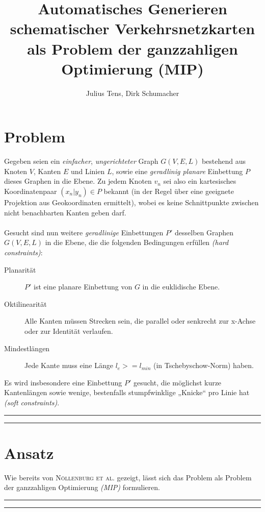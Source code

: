 \documentclass[a4paper,11pt]{amsart}
\title[Generieren schematischer Verkehrsnetzkarten]{Automatisches Generieren schematischer Verkehrsnetzkarten als Problem der ganzzahligen Optimierung (MIP)}
\author{Julius Tens, Dirk Schumacher}
\begin{document}
\maketitle

\section*{Problem}

\noindent Gegeben seien ein \textit{einfacher}, \textit{ungerichteter} Graph $G(V,E,L)$ bestehend aus Knoten $V$, Kanten $E$ und Linien $L$, sowie eine \textit{geradlinig planare} Einbettung $P$ dieses Graphen in die Ebene. Zu jedem Knoten $v_n$ sei also ein kartesisches Koordinatenpaar $(x_n | y_n) \in P$ bekannt (in der Regel über eine geeignete Projektion aus Geokoordinaten ermittelt), wobei es keine Schnittpunkte zwischen nicht benachbarten Kanten geben darf.
\\\\
Gesucht sind nun weitere \textit{geradlinige} Einbettungen $P'$ desselben Graphen $G(V,E,L)$ in die Ebene, die die folgenden Bedingungen erfüllen \textit{(hard constraints)}:
\bigskip

\begin{description}
\item[Planarität] $P'$ ist eine planare Einbettung von $G$ in die euklidische Ebene.
\bigskip
\item[Oktilinearität] Alle Kanten müssen Strecken sein, die parallel oder senkrecht zur x-Achse oder zur Identität verlaufen.
\bigskip
\item[Mindestlängen] Jede Kante muss eine Länge $l_e >= l_{min}$ (in Tschebyschow-Norm) haben.
\bigskip
\end{description}

\noindent Es wird insbesondere eine Einbettung $P'$ gesucht, die möglichst kurze Kantenlängen sowie wenige, bestenfalls stumpfwinklige „Knicke“ pro Linie hat \textit{(soft constraints)}.
\bigskip
\bigskip
\hrule
\hrule
\section*{Ansatz}

\noindent Wie bereits von \textsc{Nöllenburg et al.} gezeigt, lässt sich das Problem als Problem der ganzzahligen Optimierung \textit{(MIP)} formulieren.
\bigskip
\bigskip
\hrule
\hrule
\end{document}

